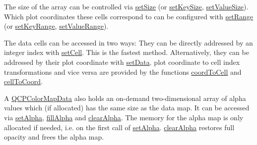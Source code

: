 The size of the array can be controlled via \hyperlink{class_q_c_p_color_map_data_a0d9ff35c299d0478b682bfbcdd9c097e}{set\+Size} (or \hyperlink{class_q_c_p_color_map_data_ac7ef70e383aface34b44dbde49234b6b}{set\+Key\+Size}, \hyperlink{class_q_c_p_color_map_data_a0893c9e3914513048b45e3429ffd16f2}{set\+Value\+Size}). Which plot coordinates these cells correspond to can be configured with \hyperlink{class_q_c_p_color_map_data_aad9c1c7c703c1339489fc730517c83d4}{set\+Range} (or \hyperlink{class_q_c_p_color_map_data_a0738c485f3c9df9ea1241b7a8bb6a86e}{set\+Key\+Range}, \hyperlink{class_q_c_p_color_map_data_ada1b2680ba96a5f4175b6d341cf75d23}{set\+Value\+Range}).

The data cells can be accessed in two ways\+: They can be directly addressed by an integer index with \hyperlink{class_q_c_p_color_map_data_a8e75eaf8746596319032a93f3d2d0683}{set\+Cell}. This is the fastest method. Alternatively, they can be addressed by their plot coordinate with \hyperlink{class_q_c_p_color_map_data_afd2083ccfd6987ec94aa7ef8e91ca39a}{set\+Data}. plot coordinate to cell index transformations and vice versa are provided by the functions \hyperlink{class_q_c_p_color_map_data_a26e33c5ec7094b60136350bcd77d3737}{coord\+To\+Cell} and \hyperlink{class_q_c_p_color_map_data_ac96d6e84befe7b9951b5da6d4d4a2a47}{cell\+To\+Coord}.

A \hyperlink{class_q_c_p_color_map_data}{Q\+C\+P\+Color\+Map\+Data} also holds an on-\/demand two-\/dimensional array of alpha values which (if allocated) has the same size as the data map. It can be accessed via \hyperlink{class_q_c_p_color_map_data_aaf7de5b34c58f38d8f4c1ceb064a876c}{set\+Alpha}, \hyperlink{class_q_c_p_color_map_data_a93e2a549d7702bc849cd48a585294657}{fill\+Alpha} and \hyperlink{class_q_c_p_color_map_data_a14d08b9c3720cd719400079b86d3906b}{clear\+Alpha}. The memory for the alpha map is only allocated if needed, i.\+e. on the first call of \hyperlink{class_q_c_p_color_map_data_aaf7de5b34c58f38d8f4c1ceb064a876c}{set\+Alpha}. \hyperlink{class_q_c_p_color_map_data_a14d08b9c3720cd719400079b86d3906b}{clear\+Alpha} restores full opacity and frees the alpha map.

